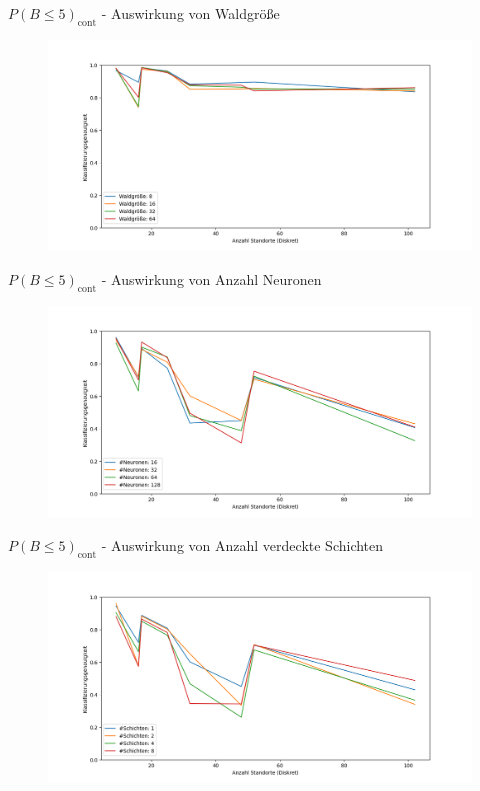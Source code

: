 \documentclass[10pt]{beamer}
\begin{document}
\begin{frame}{$P(B\leq5)_{\text{cont}}$ - Auswirkung von Waldgröße}
    \begin{figure}
        \centering
        \includegraphics[width=\linewidth]{location_recognition/multiple_best_by_group_dt_trees_acc_5_cont.png}
    \end{figure}
\end{frame}

\begin{frame}{$P(B\leq5)_{\text{cont}}$ - Auswirkung von Anzahl Neuronen}
    \begin{figure}
        \centering
        \includegraphics[width=\linewidth]{location_recognition/multiple_best_by_group_knn_neurons_acc_5_cont.png}
    \end{figure}
\end{frame}

\begin{frame}{$P(B\leq5)_{\text{cont}}$ - Auswirkung von Anzahl verdeckte Schichten}
    \begin{figure}
        \centering
        \includegraphics[width=\linewidth]{location_recognition/multiple_best_by_group_knn_layers_acc_5_cont.png}
    \end{figure}
\end{frame}
\end{document}
